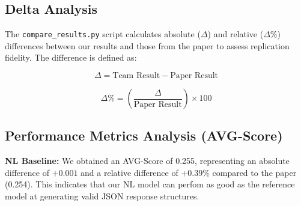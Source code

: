 \documentclass[12pt]{article}
\begin{document}
\begin{table}[h!]
\centering
{}
\caption{Baseline comparison between published results and our replication.}
\end{table}


\subsection{Delta Analysis}

The \texttt{compare\_results.py} script calculates absolute ($\Delta$) and relative ($\Delta\%$) differences between our results and those from the paper to assess replication fidelity. The difference is defined as:

\[
\Delta = \text{Team Result} - \text{Paper Result}
\]

\[
\Delta\% = \left( \frac{\Delta}{\text{Paper Result}} \right) \times 100
\]

\subsection{Performance Metrics Analysis (AVG-Score)}

\textbf{NL Baseline:}  
We obtained an AVG-Score of 0.255, representing an absolute difference of $+0.001$ and a relative difference of $+0.39\%$ compared to the paper (0.254). This indicates that our NL model can perfom as good as the reference model at generating valid JSON response structures.
\end{document}
